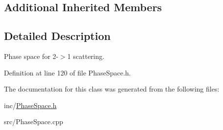 \subsection*{Additional Inherited Members}


\subsection{Detailed Description}
Phase space for 2-\/$>$1 scattering. 

Definition at line 120 of file Phase\-Space.\-h.



The documentation for this class was generated from the following files\-:\begin{DoxyCompactItemize}
\item 
inc/\hyperlink{PhaseSpace_8h}{Phase\-Space.\-h}\item 
src/Phase\-Space.\-cpp\end{DoxyCompactItemize}
